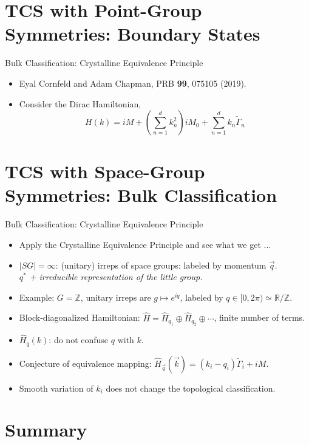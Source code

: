 \documentclass[xcolor=table, 11pt, aspectratio=169]{beamer}
\begin{document}
  \section{TCS with Point-Group Symmetries: Boundary States}

  \begin{frame}{Bulk Classification: Crystalline Equivalence Principle}
    \begin{itemize}
      \item Eyal Cornfeld and Adam Chapman, PRB \textbf{99}, 075105 (2019).
      \item Consider the Dirac Hamiltonian,
      \[H(k)=iM+\left(\sum_{n=1}^d k_n^2\right)iM_0+\sum_{n=1}^d k_n\tilde{\Gamma}_n\]
    \end{itemize}
  \end{frame}

  \section{TCS with Space-Group Symmetries: Bulk Classification}

  \begin{frame}{Bulk Classification: Crystalline Equivalence Principle}
    \begin{itemize}
      \item Apply the Crystalline Equivalence Principle and see what we get ...
      \item $|SG|=\infty$: (unitary) irreps of space groups: labeled by momentum $\vec q$.\\
      \emph{$q^\ast$ + irreducible representation of the little group.}
      \item Example: $G=\mathbb Z$, unitary irreps are $g\mapsto e^{iq}$, labeled by $q\in [0,2\pi)\simeq\mathbb R/\mathbb Z$.
      \item Block-diagonalized Hamiltonian: $\hat H=\hat H_{q_1}\oplus\hat H_{q_2}\oplus\cdots$, \alert{finite} number of terms.
      \item $\hat H_q(k)$: do not confuse $q$ with $k$.
      \item Conjecture of equivalence mapping: $\hat H_{\vec q}(\vec k)=(k_i-q_i)\tilde\Gamma_i+iM$.
      \item Smooth variation of $k_i$ does not change the topological classification.
    \end{itemize}
  \end{frame}

  \section{Summary}
\end{document}
